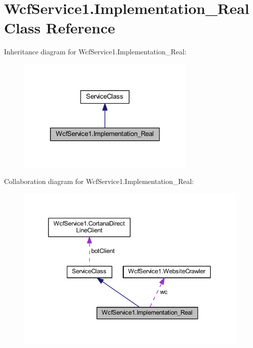 \hypertarget{class_wcf_service1_1_1_implementation___real}{}\section{Wcf\+Service1.\+Implementation\+\_\+\+Real Class Reference}
\label{class_wcf_service1_1_1_implementation___real}


Inheritance diagram for Wcf\+Service1.\+Implementation\+\_\+\+Real\+:\nopagebreak
\begin{figure}[H]
\begin{center}
\leavevmode
\includegraphics[width=244pt]{class_wcf_service1_1_1_implementation___real__inherit__graph}
\end{center}
\end{figure}


Collaboration diagram for Wcf\+Service1.\+Implementation\+\_\+\+Real\+:\nopagebreak
\begin{figure}[H]
\begin{center}
\leavevmode
\includegraphics[width=344pt]{class_wcf_service1_1_1_implementation___real__coll__graph}
\end{center}
\end{figure}

